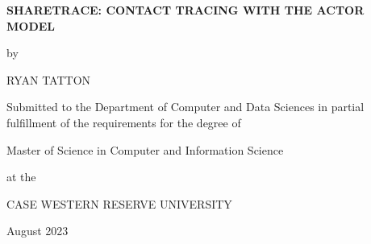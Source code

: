 \begin{titlepage}
\centering

\Large

\textbf{SHARETRACE: CONTACT TRACING WITH THE ACTOR MODEL}

\vspace{0.1in}

\large

by

\vspace{0.1in}

\Large

RYAN TATTON

\vspace{0.1in}

\large

Submitted to the Department of Computer and Data Sciences in partial
fulfillment of the requirements for the degree of

\vspace{0.1in}

Master of Science in Computer and Information Science

\vspace{0.1in}

at the

\vspace{0.1in}

CASE WESTERN RESERVE UNIVERSITY

\vspace{0.1in}

August 2023
\end{titlepage}